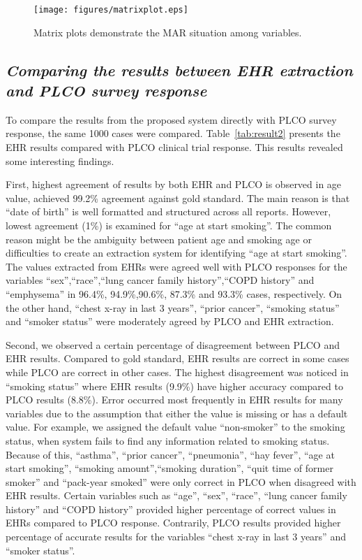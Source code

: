 \documentclass{amia}
\begin{document}
\begin{figure}[h!]
\centering
\texttt{[image: figures/matrixplot.eps]}
\caption{Matrix plots demonstrate the MAR situation among variables.}
\label{fig:matrixplot}
\end{figure}

\subsection*{\textit{Comparing the results between EHR extraction and PLCO survey response}}
To compare the results from the proposed system directly with PLCO survey response, the same 1000 cases were compared. Table~\ref{tab:result2} presents the EHR results compared with PLCO clinical trial response. This results revealed some interesting findings.

First, highest agreement of results by both EHR and PLCO is observed in age value, achieved 99.2\% agreement against gold standard. The main reason is that ``date of birth'' is well formatted and structured across all reports. However, lowest agreement (1\%) is examined for ``age at start smoking''. The common reason might be the ambiguity between patient age and smoking age or difficulties to create an extraction system for identifying ``age at start smoking''. The values extracted from EHRs were agreed well with PLCO responses for the variables ``sex'',``race'',``lung cancer family history'',``COPD history'' and ``emphysema'' in 96.4\%, 94.9\%,90.6\%, 87.3\% and 93.3\% cases, respectively. On the other hand, ``chest x-ray in last 3 years'', ``prior cancer'', ``smoking status'' and ``smoker status'' were moderately agreed by PLCO and EHR extraction.    

Second, we observed a certain percentage of disagreement between PLCO and EHR results. Compared to gold standard, EHR results are correct in some cases while PLCO are correct in other cases. The highest disagreement was noticed in ``smoking status'' where EHR results (9.9\%) have higher accuracy compared to PLCO results (8.8\%). Error occurred most frequently in EHR results for many variables due to the assumption that either the value is missing or has a default value. For example, we assigned the default value ``non-smoker'' to the smoking status, when system fails to find any information related to smoking status. Because of this, ``asthma'', ``prior cancer'', ``pneumonia'', ``hay fever'', ``age at start smoking'', ``smoking amount'',``smoking duration'', ``quit time of former smoker'' and ``pack-year smoked'' were only correct in PLCO when disagreed with EHR results. Certain variables such as ``age'', ``sex'', ``race'', ``lung cancer family history'' and ``COPD history'' provided higher percentage of correct values in EHRs compared to PLCO response. Contrarily, PLCO results provided higher percentage of accurate results for the variables ``chest x-ray in last 3 years'' and ``smoker status''. 
\end{document}
